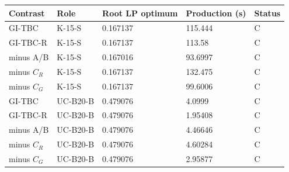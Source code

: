 \documentclass[
  american,
  11pt,
]{article}
\newcounter{none} %
\begin{document}
{\def\LTcaptype{none} %
\begin{longtable}[]{@{}lllll@{}}
\toprule\noalign{}
Contrast & Role & Root LP optimum & Production (s) & Status \\
\midrule\noalign{}
\endhead
\bottomrule\noalign{}
\endlastfoot
GI-TBC & K-15-S & 0.167137 & 115.444 & C \\
GI-TBC-R & K-15-S & 0.167137 & 113.58 & C \\
minus A/B & K-15-S & 0.167016 & 93.6997 & C \\
minus \(C_R\) & K-15-S & 0.167137 & 132.475 & C \\
minus \(C_G\) & K-15-S & 0.167137 & 99.6006 & C \\
GI-TBC & UC-B20-B & 0.479076 & 4.0999 & C \\
GI-TBC-R & UC-B20-B & 0.479076 & 1.95408 & C \\
minus A/B & UC-B20-B & 0.479076 & 4.46646 & C \\
minus \(C_R\) & UC-B20-B & 0.479076 & 4.60284 & C \\
minus \(C_G\) & UC-B20-B & 0.479076 & 2.95877 & C \\
\end{longtable}
}
\end{document}
